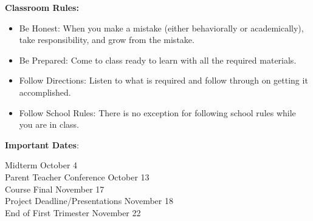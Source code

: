 \documentclass[12pt]{article}
\begin{document}
\begin{multicols}{2}
\noindent\textbf{Classroom Rules:}
\begin{itemize}
\setlength\itemsep{0em}
\item Be Honest:  When you make a mistake (either behaviorally or academically), take responsibility, and grow from the mistake. 

\item Be Prepared: Come to class ready to learn with all the required materials.

\item Follow Directions:  Listen to what is required and follow through on getting it accomplished.

\item Follow School Rules: There is no exception for following school rules while you are in class.

\end{itemize}

\end{multicols}


\noindent\textbf{Important Dates}:
\begin{center} \begin{minipage}{5in}
\begin{flushleft}
Midterm \dotfill October 4\\
Parent Teacher Conference \dotfill October 13 \\
Course Final \dotfill November 17\\
Project Deadline/Presentations \dotfill November 18\\
End of First Trimester \dotfill November 22
\end{flushleft}
\end{minipage}
\end{center}
\end{document}
